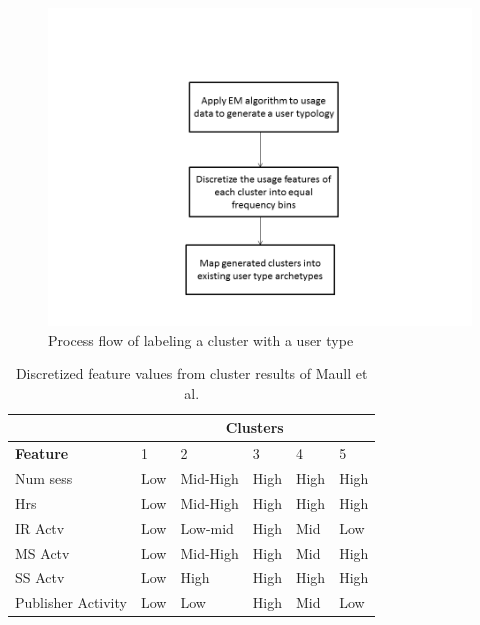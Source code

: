 \documentclass{acm_proc_article-sp}
\begin{document}
\begin{figure}
\centering
\includegraphics[width=1 \linewidth]{./process_flow}
\caption{Process flow of labeling a cluster with a user type}
\label{fig:process_flow}
\end{figure}

\begin{table}
\caption{Discretized feature values from cluster results of Maull et al. \cite{maullunderstanding}}
\label{maull_features}
\begin{tabular}{|p{2.5cm}|l|l|l|l|l|}
\hline
& \multicolumn{5}{c|}{\textbf{Clusters}}  \\ \hline
\textbf{Feature} & 1 & 2 & 3 & 4 & 5 \\ \hline
Num sess & Low & Mid-High & High & High & High \\ \hline
Hrs & Low & Mid-High & High & High & High \\ \hline
IR Actv & Low & Low-mid & High & Mid & Low \\ \hline
MS Actv & Low & Mid-High & High & Mid & High \\ \hline
SS Actv & Low & High & High & High & High \\ \hline
Publisher Activity & Low & Low & High & Mid & Low \\ \hline
\end{tabular}
\end{table}
\end{document}
